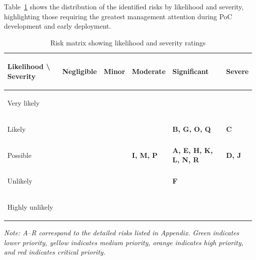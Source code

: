 \documentclass[11pt,a4paper]{article}
\renewcommand{\arraystretch}{1.12}
\begin{document}
Table~\ref{tab:risk-matrix} shows the distribution of the identified risks by likelihood and severity, highlighting those requiring the greatest management attention during PoC development and early deployment.
\begin{table}[H]
\centering
\caption{Risk matrix showing likelihood and severity ratings}
\label{tab:risk-matrix}
\renewcommand{\arraystretch}{1.45}
\setlength{\tabcolsep}{6pt}
\small

\begin{tabularx}{\textwidth}{|>{\bfseries\raggedright\arraybackslash}p{3.0cm}|>{\centering\arraybackslash}X|>{\centering\arraybackslash}X|>{\centering\arraybackslash}X|>{\centering\arraybackslash}X|>{\centering\arraybackslash}X|}
\hline
\textbf{Likelihood \textbackslash{} Severity} 
& \textbf{Negligible} 
& \textbf{Minor} 
& \textbf{Moderate} 
& \textbf{Significant} 
& \textbf{Severe} \\
\hline

Very likely 
& \cellcolor{riskyellow} 
& \cellcolor{riskyellow} 
& \cellcolor{riskorange} 
& \cellcolor{riskred} 
& \cellcolor{riskred} \\
\hline

Likely 
& \cellcolor{riskgreen} 
& \cellcolor{riskyellow} 
& \cellcolor{riskorange} 
& \cellcolor{riskorange}\textbf{B, G, O, Q} 
& \cellcolor{riskred}\textbf{C} \\
\hline

Possible 
& \cellcolor{riskgreen} 
& \cellcolor{riskgreen} 
& \cellcolor{riskyellow}\textbf{I, M, P} 
& \cellcolor{riskyellow}\textbf{A, E, H, K, L, N, R} 
& \cellcolor{riskorange}\textbf{D, J} \\
\hline

Unlikely 
& \cellcolor{riskgreen} 
& \cellcolor{riskgreen} 
& \cellcolor{riskyellow} 
& \cellcolor{riskyellow}\textbf{F} 
& \cellcolor{riskorange} \\
\hline

Highly unlikely 
& \cellcolor{riskgreen} 
& \cellcolor{riskgreen} 
& \cellcolor{riskgreen} 
& \cellcolor{riskyellow} 
& \cellcolor{riskyellow} \\
\hline

\end{tabularx}

\vspace{0.3em}
\footnotesize\emph{Note: A--R correspond to the detailed risks listed in Appendix. Green indicates lower priority, yellow indicates medium priority, orange indicates high priority, and red indicates critical priority.}

\normalsize
\end{table}
\end{document}
